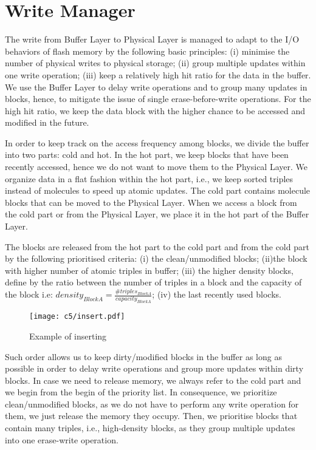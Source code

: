 \section{Write Manager}

The write from Buffer Layer to Physical Layer is managed to adapt to the I/O behaviors of flash memory by the following basic principles: (i) minimise the number of physical writes to physical storage; (ii) group multiple updates within one write operation; (iii) keep a relatively high hit ratio for the data in the buffer. We use the Buffer Layer to delay write operations and to group many updates in blocks, hence, to mitigate the issue of single erase-before-write operations. For the high hit ratio, we keep the data block with the higher chance to be accessed and modified in the future. 

In order to keep track on the access frequency among blocks, we divide the buffer into two parts: cold and hot. In the hot part, we keep blocks that have been recently accessed, hence we do not want to move them to the Physical Layer. We organize data in a flat fashion within the hot part, i.e., we keep sorted triples instead of molecules to speed up atomic updates. The cold part contains molecule blocks that can be moved to the Physical Layer. When we access a block from the cold part or from the Physical Layer, we place it in the hot part of the Buffer Layer. 

The blocks are released from the hot part to the cold part and from the cold part by the following prioritised 
criteria: (i) the clean/unmodified blocks; (ii)the block with higher number of atomic triples in buffer; (iii) the higher density blocks, define by the ratio between the number of triples in a block and the capacity of the block i.e: $density_{Block A} = \frac{\#triples_{Block A}}{capacity_{Block A}}$; (iv) the last recently used blocks.   

\begin{figure}[ht!]
\texttt{[image: c5/insert.pdf]}
\caption{Example of inserting}
\label{fig:insert}
\end{figure}

Such order allows us to keep dirty/modified blocks in the buffer as long as possible in order to delay write operations and group more updates within dirty blocks. In case we need to release memory, we always refer to the cold part and we begin from the begin of the priority list. In consequence, we prioritize clean/unmodified blocks, as we do not have to perform any write operation for them, we just release the memory they occupy. Then, we prioritise blocks that contain many triples, i.e., high-density blocks, as they group multiple updates into one erase-write operation. 

